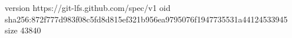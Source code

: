 version https://git-lfs.github.com/spec/v1
oid sha256:872f777d983f08c5fd8d815ef321b956ea9795076f1947735531a44124533945
size 43840
